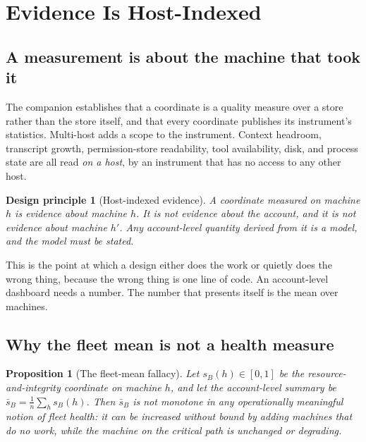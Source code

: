 \documentclass[11pt]{article}
\newtheorem{principle}{Design principle}
\newtheorem{proposition}{Proposition}
\begin{document}
\section{Evidence Is Host-Indexed}
\label{sec:hostindexed}

\subsection{A measurement is about the machine that took it}

The companion establishes that a coordinate is a quality measure over a store rather than the store itself, and that every coordinate publishes its instrument's statistics. Multi-host adds a scope to the instrument. Context headroom, transcript growth, permission-store readability, tool availability, disk, and process state are all read \emph{on a host}, by an instrument that has no access to any other host.

\begin{principle}[Host-indexed evidence]
\label{prin:hostindexed}
A coordinate measured on machine $h$ is evidence about machine $h$. It is not evidence about the account, and it is not evidence about machine $h'$. Any account-level quantity derived from it is a \emph{model}, and the model must be stated.
\end{principle}

This is the point at which a design either does the work or quietly does the wrong thing, because the wrong thing is one line of code. An account-level dashboard needs a number. The number that presents itself is the mean over machines.

\subsection{Why the fleet mean is not a health measure}

\begin{proposition}[The fleet-mean fallacy]
\label{prop:fleetmean}
Let $s_B(h) \in [0,1]$ be the resource-and-integrity coordinate on machine $h$, and let the account-level summary be $\bar{s}_B = \frac{1}{n}\sum_{h} s_B(h)$. Then $\bar{s}_B$ is not monotone in any operationally meaningful notion of fleet health: it can be increased without bound by adding machines that do no work, while the machine on the critical path is unchanged or degrading.
\end{proposition}
\end{document}
